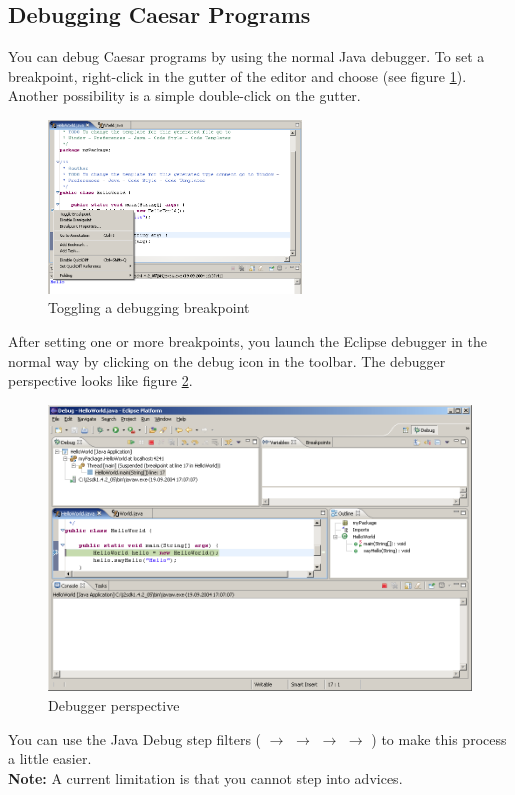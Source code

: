 \subsection{Debugging Caesar Programs}
You can debug Caesar programs by using the normal Java debugger. To set a breakpoint, right-click in the gutter of the editor and choose (see figure \ref{fig:brake_point}). Another possibility is a simple double-click on the gutter.
\begin{figure}[htbp]
	\centering
		\includegraphics[width=0.60\textwidth]{images/brake_point.png}
	\caption{Toggling a debugging breakpoint}
	\label{fig:brake_point}
\end{figure}

After setting one or more breakpoints, you launch the Eclipse debugger in the normal way by clicking on the debug icon in the toolbar. The debugger perspective looks like figure \ref{fig:debuger}.
\begin{figure}[htbp]
	\centering
		\includegraphics[width=1.0\textwidth]{images/debug1.png}
	\caption{Debugger perspective}
	\label{fig:debuger}
\end{figure}

You can use the Java Debug step filters ( $\rightarrow$  $\rightarrow$  $\rightarrow$  $\rightarrow$ ) to make this process a little easier.\\
\textbf{Note:} A current limitation is that you cannot step into advices.